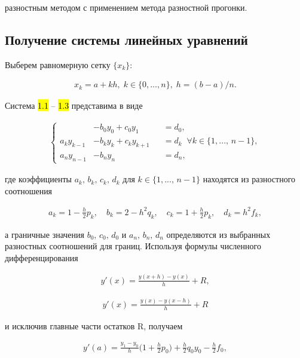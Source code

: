 разностным методом с применением метода разностной прогонки.

\subsection{Получение системы линейных уравнений}

Выберем равномерную сетку $ \{x_k\} $:

\hs
\begin{gather}
x_k = a + kh, \; k \in \{0, \dots, n\}, \; h = (b-a)/n.
\end{gather}

Система \hl{1.1} -- \hl{1.3} представима в виде

\hs
\begin{gather}
    \left\{
    \begin{aligned}
        & -b_0 y_0 + c_0 y_1 && = d_0, \\
        a_k y_{k-1} & -b_k y_k +c_k y_{k+1} && = d_k \;\; \forall k \in \{1,...,\,n-1\}, \\
        a_n y_{n-1} & -b_n y_n && = d_n,
    \end{aligned}
    \right.
\end{gather}

где коэффициенты $ a_k, \, b_k, \, c_k, \, d_k $ для $ k\in\{1,...,\,n-1\} $ находятся из разностного соотношения

\hs
\begin{gather}
    a_k = 1 - \frac{h}{2} p_k, \quad b_k = 2 - h^2 q_k, \quad c_k = 1 + \frac{h}{2} p_k, \quad d_k = h^2 f_k,
\end{gather}

а граничные значения $ b_0, \, c_0, \, d_0 $ и $ a_n, \, b_n, \, d_n $ определяются из выбранных разностных соотношений для границ. Используя формулы численного дифференцирования

\hs
\begin{gather}
    y'(x) = \frac{y(x+h)-y(x)}{h} + R,
\end{gather}

\begin{gather}
    y'(x) = \frac{y(x)-y(x-h)}{h} + R
\end{gather}

и исключив главные части остатков R, получаем

\hs
\begin{gather}
    y'(a) = \frac{y_1 - y_0}{h} \Big(1 + \frac{h}{2} p_0 \Big) + \frac{h}{2} q_0 y_0 - \frac{h}{2} f_0,
\end{gather}

